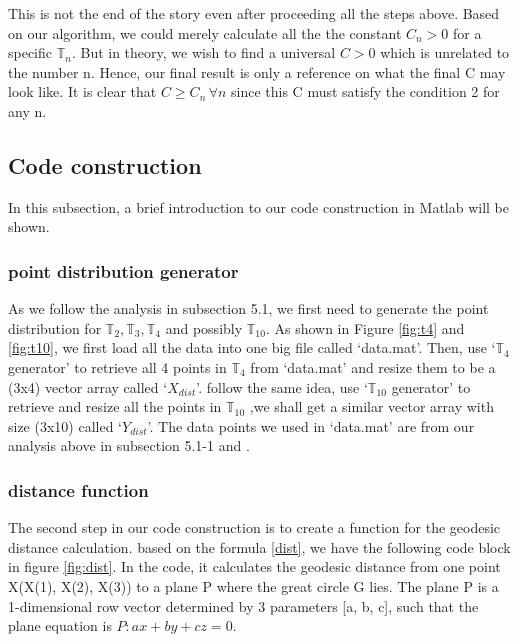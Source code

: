 \documentclass[12pt]{article}
\numberwithin{equation}{section}
\let\bb\mathbb
\let\bb\mathbb
\begin{document}
		
	This is not the end of the story even after proceeding all the steps above. Based on our algorithm, we could merely calculate all the the constant $C_n>0$ for a specific $\bb{T}_n$. But in theory, we wish to find a universal $C>0$ which is unrelated to the number n. Hence, our final result is only a reference on what the final C may look like. It is clear that $C \geq C_n \, \forall n$ since this C must satisfy the condition 2 for any n.
	
	\newpage
	
	\subsection{Code construction} 
		In this subsection, a brief introduction to our code construction in Matlab will be shown. 
		\subsubsection{point distribution generator}
		As we follow the analysis in subsection 5.1, we first need to generate the point distribution for $\bb{T}_2, \bb{T}_3, \bb{T}_4$ and possibly $\bb{T}_{10}$. As shown in Figure \ref{fig:t4} and \ref{fig:t10}, we first load all the data into one big file called `data.mat'. Then, use `$\bb{T}_4$ generator' to retrieve all 4 points in $\bb{T}_4$ from `data.mat' and resize them to be a (3x4) vector array called `$X_{dist}$'. follow the same idea, use `$\bb{T}_{10}$ generator' to retrieve and resize all the points in $\bb{T}_{10}$ ,we shall get a similar vector array with size (3x10) called `$Y_{dist}$'. The data points we used in `data.mat' are from our analysis above in subsection 5.1-1 and \cite{sugimoto_2015_exact}.
		\subsubsection{distance function}
			The second step in our code construction is to create a function for the geodesic distance calculation. based on the formula \ref{dist}, we have the following code block in figure \ref{fig:dist}. In the code, it calculates the geodesic distance from one point X(X(1), X(2), X(3)) to a plane P where the great circle G lies. The plane P is a 1-dimensional row vector determined by 3 parameters [a, b, c], such that the plane equation is $P: ax+by+cz = 0 $.
\end{document}
